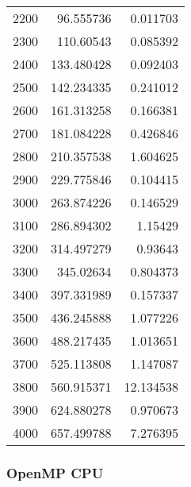 \begin{tabular}{r r r}
2200 & 96.555736 & 0.011703 \\
2300 & 110.60543 & 0.085392 \\
2400 & 133.480428 & 0.092403 \\
2500 & 142.234335 & 0.241012 \\
2600 & 161.313258 & 0.166381 \\
2700 & 181.084228 & 0.426846 \\
2800 & 210.357538 & 1.604625 \\
2900 & 229.775846 & 0.104415 \\
3000 & 263.874226 & 0.146529 \\
3100 & 286.894302 & 1.15429 \\
3200 & 314.497279 & 0.93643 \\
3300 & 345.02634 & 0.804373 \\
3400 & 397.331989 & 0.157337 \\
3500 & 436.245888 & 1.077226 \\
3600 & 488.217435 & 1.013651 \\
3700 & 525.113808 & 1.147087 \\
3800 & 560.915371 & 12.134538 \\
3900 & 624.880278 & 0.970673 \\
4000 & 657.499788 & 7.276395 \\
\end{tabular}

\subsubsection{OpenMP CPU}

